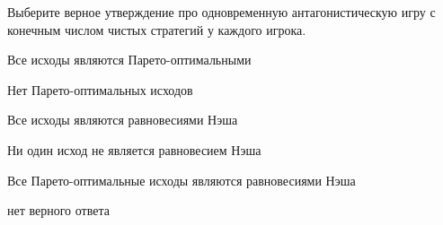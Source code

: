 
\begin{question}
Выберите верное утверждение про одновременную антагонистическую игру с
конечным числом чистых стратегий у каждого игрока.
\begin{answerlist}
  \item Все исходы являются Парето-оптимальными
  \item Нет Парето-оптимальных исходов
  \item Все исходы являются равновесиями Нэша
  \item Ни один исход не является равновесием Нэша
  \item Все Парето-оптимальные исходы являются равновесиями Нэша
  \item нет верного ответа
\end{answerlist}
\end{question}


